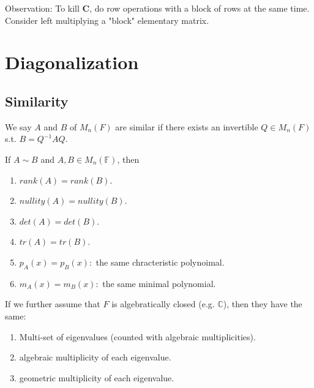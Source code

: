 \documentclass[12pt]{article}
\begin{document}
\begin{pf}
    Observation: To kill $\textbf{C}$, do row operations with a block of rows at the same time.
    Consider left multiplying a "block" elementary matrix.
\end{pf}

\newpage
\section{Diagonalization}
\subsection{Similarity}

\begin{definition}
    We say $A$ and $B$ of $M_n(F)$ are similar if there exists an invertible $Q\in M_n(F)$ s.t. $B=Q^{-1}AQ$.
\end{definition}


\begin{theorem}
    If $A\sim B$ and $A,B\in M_n(\mathbb{F})$, then
    \begin{enumerate}
        \item $rank(A)=rank(B)$.
        \item $nullity(A)=nullity(B)$.
        \item $det(A)=det(B)$.
        \item $tr(A)=tr(B)$.
        \item $p_A(x)=p_B(x):$ the same chracteristic polynoimal.
        \item $m_A(x)=m_B(x):$ the same minimal polynomial.
    \end{enumerate}

    If we further assume that $F$ is algebratically closed (e.g. $\mathbb{C}$), then they have the same:
    \begin{enumerate}
        \item Multi-set of eigenvalues (counted with algebraic multiplicities).
        \item algebraic multiplicity of each eigenvalue.
        \item geometric multiplicity of each eigenvalue.
    \end{enumerate}
\end{theorem}
\end{document}
